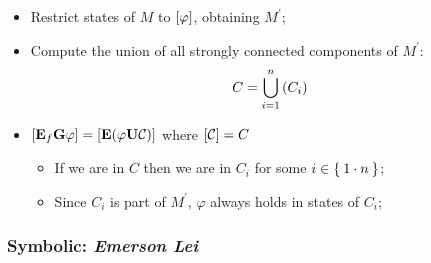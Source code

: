     \begin{itemize}

    \item   Restrict states of $M$ to $\left[{\varphi}\right]$, obtaining
            $M^\prime$;

    \item   Compute the union of all strongly connected components of
            $M^\prime$: \[C = \bigcup_{i = 1}^{n}\left({C_i}\right)\]

    \item   $\left[{\mathcal{\mathcal{\sf \bf E}}_{f}{\mathcal{\sf \bf G}\varphi}}\right] =
             \left[{\mathcal{\mathcal{\sf \bf E}}({\varphi}\mathcal{\sf \bf U}{\mathcal{C}})}\right]$
            where $\left[{\mathcal{C}}\right] = C$

        \begin{itemize}
        \item   If we are in $C$ then we are in $C_i$ for some $i \in 
                \Set{ 1 \cdot n }$;
        \item   Since $C_i$ is part of $M^\prime$, $\varphi$ always holds
                in states of $C_i$;
        \end{itemize}

    \end{itemize}

\subsubsection{Symbolic: \emph{Emerson Lei}}

